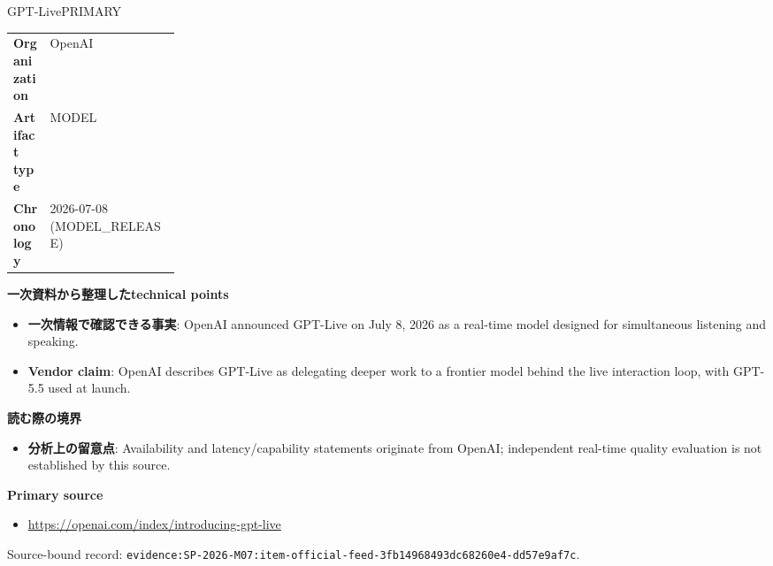 \begin{technicalnote}{GPT-Live}{PRIMARY}
\begin{tabularx}{\linewidth}{@{}>{\bfseries}p{0.22\linewidth}X@{}}
Organization & OpenAI \\
Artifact type & MODEL \\
Chronology & 2026-07-08 (MODEL\_RELEASE) \\
\end{tabularx}
\smallskip
{\bfseries 一次資料から整理したtechnical points}
\begin{itemize}[leftmargin=1.5em,itemsep=0.35em]
\item \textbf{一次情報で確認できる事実}: OpenAI announced GPT-Live on July 8, 2026 as a real-time model designed for simultaneous listening and speaking.
\item \textbf{Vendor claim}: OpenAI describes GPT-Live as delegating deeper work to a frontier model behind the live interaction loop, with GPT-5.5 used at launch.
\end{itemize}
{\bfseries 読む際の境界}
\begin{itemize}[leftmargin=1.5em,itemsep=0.35em]
\item \textbf{分析上の留意点}: Availability and latency/capability statements originate from OpenAI; independent real-time quality evaluation is not established by this source.
\end{itemize}
{\bfseries Primary source}
\begingroup\sloppy
\begin{itemize}[leftmargin=1.5em,itemsep=0.25em]
\item {\scriptsize\url{https://openai.com/index/introducing-gpt-live}}
\end{itemize}
\endgroup
{\scriptsize\color{SurveyMuted}Source-bound record: \texttt{evidence:SP-2026-M07:item-official-feed-3fb14968493dc68260e4-dd57e9af7c}.}
\end{technicalnote}
\medskip

